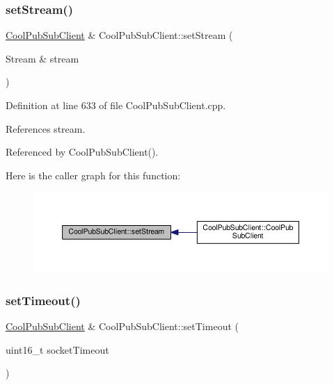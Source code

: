 \subsubsection{\texorpdfstring{set\+Stream()}{setStream()}}
{\footnotesize\ttfamily \hyperlink{class_cool_pub_sub_client}{Cool\+Pub\+Sub\+Client} \& Cool\+Pub\+Sub\+Client\+::set\+Stream (\begin{DoxyParamCaption}\item[{Stream \&}]{stream }\end{DoxyParamCaption})}



Definition at line 633 of file Cool\+Pub\+Sub\+Client.\+cpp.



References stream.



Referenced by Cool\+Pub\+Sub\+Client().

Here is the caller graph for this function\+:
\nopagebreak
\begin{figure}[H]
\begin{center}
\leavevmode
\includegraphics[width=350pt]{d8/d4b/class_cool_pub_sub_client_ae97e40823ea689ff9e36d5bdd71bb933_icgraph}
\end{center}
\end{figure}
\mbox{\label{class_cool_pub_sub_client_a2276c7e52531b597b4342fadf3722f43}} 
\subsubsection{\texorpdfstring{set\+Timeout()}{setTimeout()}}
{\footnotesize\ttfamily \hyperlink{class_cool_pub_sub_client}{Cool\+Pub\+Sub\+Client} \& Cool\+Pub\+Sub\+Client\+::set\+Timeout (\begin{DoxyParamCaption}\item[{uint16\+\_\+t}]{socket\+Timeout }\end{DoxyParamCaption})}




